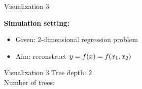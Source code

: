 \begin{vbframe}{Visualization 3}

\textbf{Simulation setting:}
\begin{itemize}
  \item Given: 2-dimensional regression problem
  \item Aim: reconstruct $ y = f(x) = f (x_1, x_2) $
\end{itemize}

\href{http://arogozhnikov.github.io/2016/06/24/gradient_boosting_explained.html}{}


\end{vbframe}

\begin{frame}{Visualization 3}
Tree depth: 2 \\
Number of trees: 


\end{frame}
